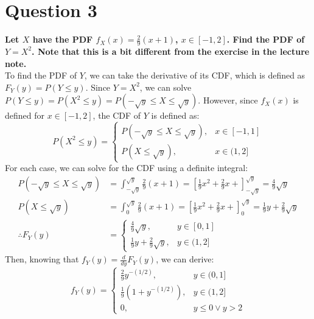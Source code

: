 \documentclass{article}
\begin{document}
\section*{Question 3}
\textbf{Let $X$ have the PDF $f_X(x)=\frac{2}{9}(x+1)$, $x\in[-1,2]$. Find the PDF of $Y=X^2$. Note that this is a bit different from the exercise in the lecture note.}
\bigskip \\
To find the PDF of $Y$, we can take the derivative of its CDF, which is defined as $F_Y(y)=P(Y\leq y)$. Since $Y=X^2$, we can solve $P(Y\leq y)=P(X^2\leq y)=P(-\sqrt{y}\leq X\leq \sqrt{y})$. However, since $f_X(x)$ is defined for $x\in[-1,2]$, the CDF of $Y$ is defined as:
\[
	P(X^2\leq y) = \begin{cases} P(-\sqrt{y}\leq X\leq \sqrt{y}), &x\in[-1,1] \\ P(X\leq \sqrt{y}), &x\in(1,2] \end{cases}
\]
For each case, we can solve for the CDF using a definite integral:
\begin{align*}
	P(-\sqrt{y}\leq X\leq \sqrt{y}) &= \int_{-\sqrt{y}}^{\sqrt{y}} \frac{2}{9}(x+1) = \left[ \frac{1}{9}x^2 + \frac{2}{9}x + \right]_{-\sqrt{y}}^{\sqrt{y}} = \frac{4}{9}\sqrt{y}	\\
	P(X\leq \sqrt{y}) &=  \int_{0}^{\sqrt{y}} \frac{2}{9}(x+1) = \left[ \frac{1}{9}x^2 + \frac{2}{9}x + \right]_{0}^{\sqrt{y}} = \frac{1}{9}y + \frac{2}{9}\sqrt{y} \\
	\therefore F_Y(y) &= 	\begin{cases}
								\frac{4}{9}\sqrt{y}, 				& y\in[0,1] \\
								\frac{1}{9}y + \frac{2}{9}\sqrt{y},	& y\in(1,2]
							\end{cases}
\end{align*}
Then, knowing that $f_Y(y)=\frac{d}{dy}F_Y(y)$, we can derive:
\[
	f_Y(y) =	\begin{cases}
					\frac{2}{9}y^{-(1/2)}, 			& y\in(0,1] \\
					\frac{1}{9}(1 + y^{-(1/2)}),	& y\in(1,2]	\\
					0,								& y\leq 0\lor y>2
				\end{cases}
\]


\end{document}
